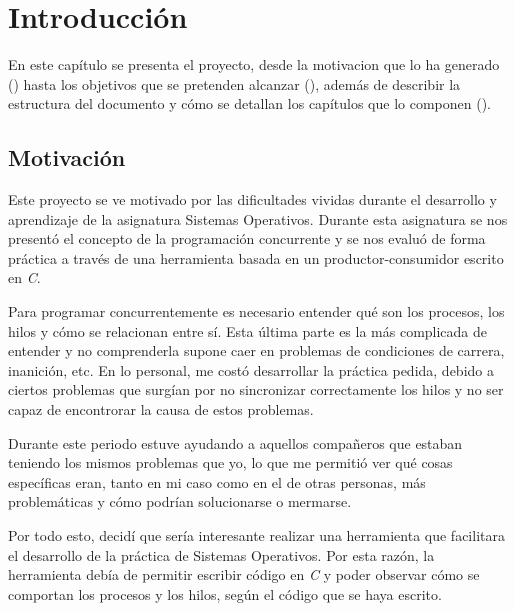 \chapter{Introducción}\label{chap:introduccion}
En este capítulo se presenta el proyecto, desde la motivacion que lo ha generado () hasta los objetivos que se pretenden alcanzar (), además de describir la estructura del documento y cómo se detallan los capítulos que lo componen ().

\section{Motivación}\label{sec:motivacion}
Este proyecto se ve motivado por las dificultades vividas durante el desarrollo y aprendizaje de la asignatura Sistemas Operativos. Durante esta asignatura se nos presentó el concepto de la programación concurrente y se nos evaluó de forma práctica a través de una herramienta basada en un productor-consumidor escrito en \textit{C}.

Para programar concurrentemente es necesario entender qué son los procesos, los hilos y cómo se relacionan entre sí.
Esta última parte es la más complicada de entender y no comprenderla supone caer en problemas de condiciones de carrera, inanición, etc.
En lo personal, me costó desarrollar la práctica pedida, debido a ciertos problemas que surgían por no sincronizar correctamente los hilos y no ser capaz de encontrorar la causa de estos problemas.

Durante este periodo estuve ayudando a aquellos compañeros que estaban teniendo los mismos problemas que yo, lo que me permitió ver qué cosas específicas eran, tanto en mi caso como en el de otras personas, más problemáticas y cómo podrían solucionarse o mermarse.

Por todo esto, decidí que sería interesante realizar una herramienta que facilitara el desarrollo de la práctica de Sistemas Operativos. Por esta razón, la herramienta debía de permitir escribir código en \textit{C} y poder observar cómo se comportan los procesos y los hilos, según el código que se haya escrito.\\

